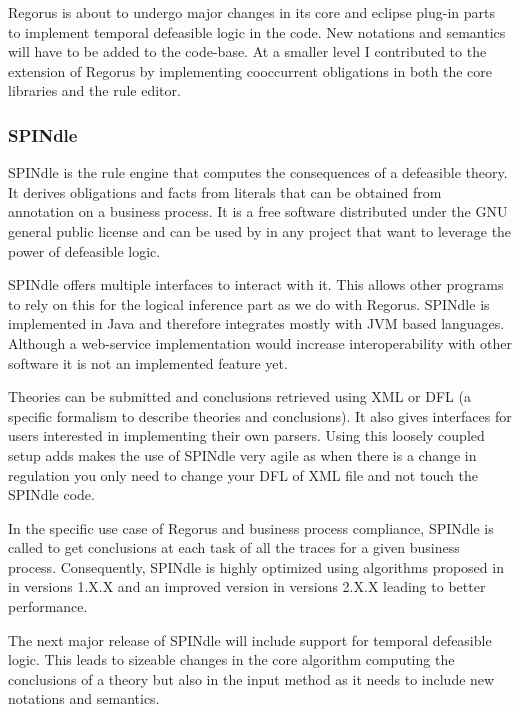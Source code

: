 \documentclass[10pt]{report}
\begin{document}
Regorus is about to undergo major changes in its core and eclipse plug-in parts to implement temporal defeasible logic in the code. New notations and semantics will have to be added to the code-base. At a smaller level I contributed to the extension of Regorus by implementing cooccurrent obligations in both the core libraries and the rule editor.

\subsubsection{SPINdle}

SPINdle is the rule engine that computes the consequences of a defeasible theory. It derives obligations and facts from literals that can be obtained from annotation on a business process. It is a free software distributed under the GNU general public license and can be used by in any project that want to leverage the power of defeasible logic.  \autocite{spindleUserManual}

SPINdle offers multiple interfaces to interact with it. This allows other programs to rely on this for the logical inference part as we do with Regorus. SPINdle is implemented in Java and therefore integrates mostly with JVM based languages. Although a web-service implementation would increase interoperability with other software it is not an implemented feature yet. 

Theories can be submitted and conclusions retrieved using XML or DFL (a specific formalism to describe theories and conclusions). It also gives interfaces for users interested in implementing their own parsers. Using this loosely coupled setup adds makes the use of SPINdle very agile as when there is a change in regulation you only need to change your DFL of XML file and not touch the SPINdle code.

In the specific use case of Regorus and business process compliance, SPINdle is called to get conclusions at each task of all the traces for a given business process. Consequently, SPINdle is highly optimized using algorithms proposed in \autocite{MaherSPINdle} in versions 1.X.X and an improved version \autocite{LamSPINdle} in versions 2.X.X leading to better performance.

The next major release of SPINdle will include support for temporal defeasible logic. This leads to sizeable changes in the core algorithm computing the conclusions of a theory but also in the input method as it needs to include new notations and semantics.
\end{document}
